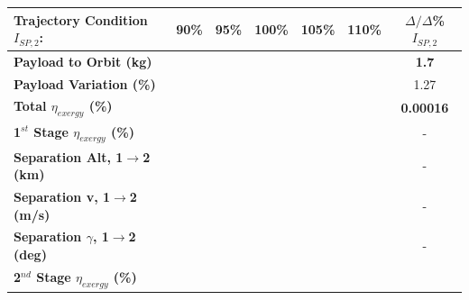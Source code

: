 \begin{table}[ht] %
	\centering
	\begin{tabular}{l c c c c c c} 
		\hline \textbf{Trajectory Condition}   \qquad  $I_{SP,2}$:
		&90\%
		&95\%
		&100\%
		&105\%
		&110\%
		& $\Delta/\Delta$\%$I_{SP,2}$
		\\
		\hline \textbf{Payload to Orbit (kg)}
		& \textbf{\PayloadToOrbitIspNinety}
		& \textbf{\PayloadToOrbitIspNinetyFive}
		& \textbf{\PayloadToOrbitIspStandard}
		& \textbf{\PayloadToOrbitIspOneHundredFive}
		& \textbf{\PayloadToOrbitIspOneHundredTen}
		&\textbf{1.7}
		\\
		\textbf{Payload Variation (\%)}
		& \PayloadVarIspNinety
		& \PayloadVarIspNinetyFive
		& \PayloadVarIspStandard
		& \PayloadVarIspOneHundredFive
		& \PayloadVarIspOneHundredTen
		&1.27
		\\
		\textbf{Total $\eta_{exergy}$ (\%)}
		& \textbf{\totalExergyEffIspNinety}
		& \textbf{\totalExergyEffIspNinetyFive}
		& \textbf{\totalExergyEffIspStandard}
		& \textbf{\totalExergyEffIspOneHundredFive}
		& \textbf{\totalExergyEffIspOneHundredTen}
		& \textbf{0.00016}
		\\
		\hline 
		\textbf{1$^{st}$ Stage $\eta_{exergy}$ (\%)}
		& \textbf{\firstExergyEffIspNinety}
		& \textbf{\firstExergyEffIspNinetyFive}
		& \textbf{\firstExergyEffIspStandard}
		& \textbf{\firstExergyEffIspOneHundredFive}
		& \textbf{\firstExergyEffIspOneHundredTen}
		& -
		\\
		\textbf{Separation Alt, 1$\rightarrow$2 (km)}
		& \firstsecondSeparationAltIspNinety
		& \firstsecondSeparationAltIspNinetyFive
		& \firstsecondSeparationAltIspStandard
		& \firstsecondSeparationAltIspOneHundredFive
		& \firstsecondSeparationAltIspOneHundredTen
		& -
		\\
		\textbf{Separation v, 1$\rightarrow$2 (m/s)}
		& \firstsecondSeparationvIspNinety
		& \firstsecondSeparationvIspNinetyFive
		& \firstsecondSeparationvIspStandard
		& \firstsecondSeparationvIspOneHundredFive
		& \firstsecondSeparationvIspOneHundredTen
		& -
		\\
		\textbf{Separation $\gamma$, 1$\rightarrow$2 (deg)}
		& \firstsecondSeparationgammaIspNinety
		& \firstsecondSeparationgammaIspNinetyFive
		& \firstsecondSeparationgammaIspStandard
		& \firstsecondSeparationgammaIspOneHundredFive
		& \firstsecondSeparationgammaIspOneHundredTen
		& -
		\\
		\hline 
		\textbf{2$^{nd}$ Stage $\eta_{exergy}$ (\%)}
		& \textbf{\secondExergyEffIspNinety}
		& \textbf{\secondExergyEffIspNinetyFive}

\end{tabular}
\end{table}
